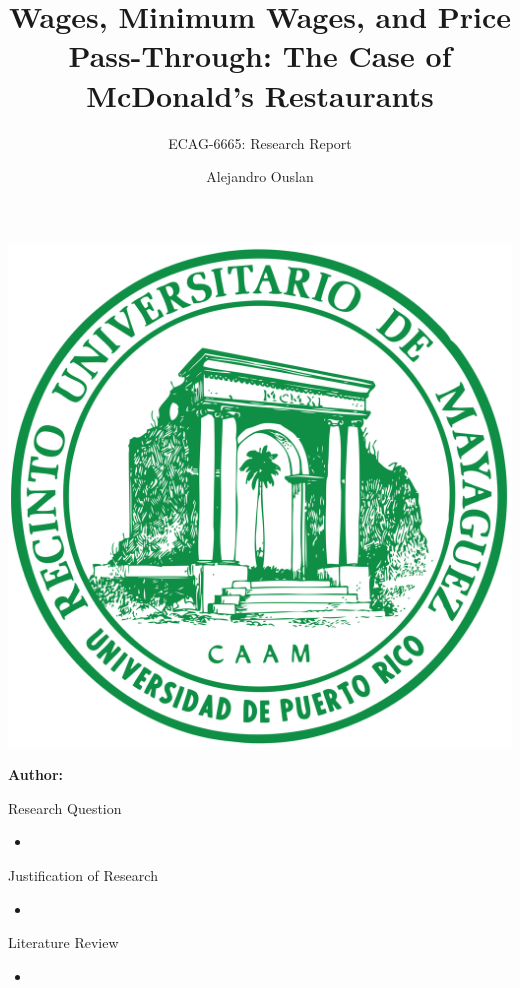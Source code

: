 \documentclass[12pt]{beamer}
\title[]{Wages, Minimum Wages, and Price Pass-Through:
	The Case of McDonald’s Restaurants}
\subtitle{ECAG-6665: Research Report}
\author[Name Surname]{Alejandro Ouslan}
\institute[institute]{University of Puerto Rico}
\date{} %
\begin{document}
\begin{frame}{}
	\vspace{\fill}

	\includegraphics[width=0.16\linewidth]{../../assets/uprm_logo.png}

	\vspace{\fill}

	\Large
	\color{main}
	\inserttitle

	\medskip

	\large
	\color{black}
	\insertsubtitle

	\vspace{\fill}

	\footnotesize
	\insertinstitute

	\vspace{\fill}

	\textbf{Author:} \insertauthor

	\medskip

	\insertdate

	\vspace{\fill}
\end{frame}

\begin{frame}[allowframebreaks]{Research Question}
	\begin{itemize}
		\item
	\end{itemize}

\end{frame}

\begin{frame}[allowframebreaks]{Justification of Research}
	\begin{itemize}
		\item
	\end{itemize}

\end{frame}

\begin{frame}[allowframebreaks]{Literature Review}
	\begin{itemize}
		\item
	\end{itemize}

\end{frame}
\end{document}
